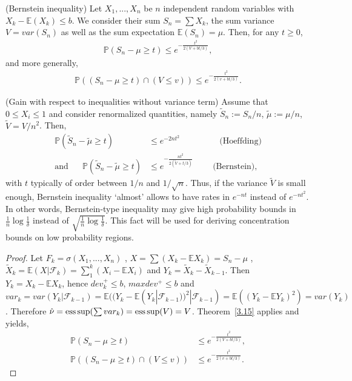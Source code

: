 \begin{proposition} ({\sc Bernstein inequality})
\label{Bernstein}
Let $X_1,...,X_n$ be $n$ independent random variables with $X_k-\mathbb{E}(X_k) \leq b$. We consider their sum $S_n=\sum X_k$, the sum variance $V=var(S_n)$ as well as the sum expectation $\mathbb{E}(S_n)=\mu$. Then, for any $t \ge 0$,
\begin{align*}
\mathbb{P}(S_n-\mu \geq t) \leq e^{-\frac{t^2}{2(V+bt/3)}},
\end{align*} 
and more generally,
\begin{align*}
\mathbb{P}((S_n-\mu \geq t)\cap(V \leq v)) \leq e^{-\frac{t^2}{2(v+bt/3)}}.
\end{align*} 
\end{proposition}

\begin{remark}({\sc Gain with respect to inequalities without variance term})
Assume that $0 \le X_i \le 1$ and consider renormalized quantities, namely $\tilde S_n := S_n/n$, $\tilde \mu:= \mu/n$, $\tilde V = V/n^2$. Then,
\begin{align*}
\mathbb{P}(\tilde S_n-\tilde \mu \geq t) &\leq e^{-2nt^2} \text{~~~~~~~~~~~~~~(Hoeffding)}\\
\text{and~~~~~}\mathbb{P}(\tilde S_n-\tilde \mu \ge t) &\leq e^{-\frac{n t^2}{2(\tilde V+t/3)}} \text{~~~~~~~(Bernstein)},
\end{align*}
with $t$ typically of order between $1/n$ and $1/\sqrt n$. Thus, if the variance $\tilde V$ is small enough, Bernstein inequality `almost' allows to have rates in $e^{-nt}$ instead of $e^{-nt^2}$. In other words, Bernstein-type inequality may give high probability bounds in $\frac{1}{n}\log{\frac{1}{\delta}}$ instead of $\sqrt{\frac{1}{n}\log{\frac{1}{\delta}}}$. This fact will be used for deriving concentration bounds on low probability regions.%
\end{remark}

\begin{proof}
Let $F_k=\sigma(X_1,...,X_n)$ , $X=\sum (X_k-\mathbb{E}X_k) =S_n-\mu$ , $\tilde X_k=\mathbb{E}(X|\mathcal{F}_k)=\sum_{1}^{k}(X_i-\mathbb{E}X_i)$ and $Y_k=\tilde X_k - \tilde X_{k-1}$.
Then~ $Y_k= X_k-\mathbb{E}X_k$, hence  $dev_k^+ \leq b$, $maxdev^+ \leq b $ and $var_k=var(Y_k|\mathcal{F}_{k-1})=\mathbb{E}((Y_k-\mathbb{E}(Y_k|\mathcal{F}_{k-1}))^2|\mathcal{F}_{k-1})=\mathbb{E}((Y_k-\mathbb{E}Y_k)^2)=var(Y_k)$.
Therefore $\hat \nu = \supess(\sum var_k)=\supess(V)=V$. Theorem~\ref{3.15} applies and yields,
\begin{align*}
\mathbb{P}(S_n-\mu \geq t) &\leq e^{-\frac{t^2}{2(V+bt/3)}},\\
\mathbb{P}((S_n-\mu \geq t)\cap(V \leq v)) &\leq e^{-\frac{t^2}{2(v+bt/3)}}.
\end{align*}
 
\end{proof}


